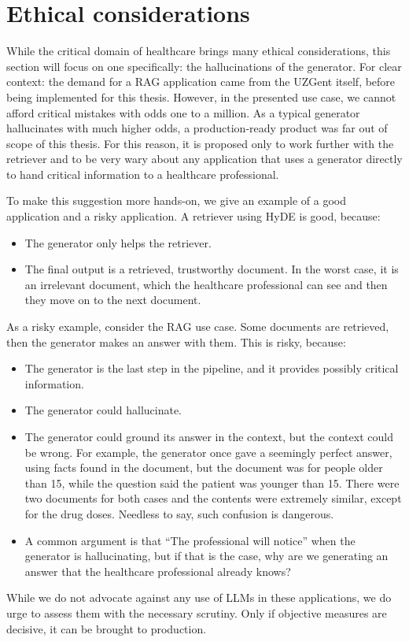 \section{Ethical considerations}
\label{Ethical considerations}
While the critical domain of healthcare brings many ethical considerations, this section will focus on one specifically: the hallucinations of the generator. For clear context: the demand for a RAG application came from the UZGent itself, before being implemented for this thesis. However, in the presented use case, we cannot afford critical mistakes with odds one to a million. As a typical generator hallucinates with much higher odds, a production-ready product was far out of scope of this thesis. For this reason, it is proposed only to work further with the retriever and to be very wary about any application that uses a generator directly to hand critical information to a healthcare professional. 

To make this suggestion more hands-on, we give an example of a good application and a risky application. A retriever using HyDE is good, because:
\begin{itemize}
    \item The generator only helps the retriever.
    \item The final output is a retrieved, trustworthy document. In the worst case, it is an irrelevant document, which the healthcare professional can see and then they move on to the next document.
\end{itemize}
As a risky example, consider the RAG use case. Some documents are retrieved, then the generator makes an answer with them. This is risky, because:
\begin{itemize}
    \item The generator is the last step in the pipeline, and it provides possibly critical information.
    \item The generator could hallucinate.
    \item The generator could ground its answer in the context, but the context could be wrong. For example, the generator once gave a seemingly perfect answer, using facts found in the document, but the document was for people older than 15, while the question said the patient was younger than 15. There were two documents for both cases and the contents were extremely similar, except for the drug doses. Needless to say, such confusion is dangerous.
    \item A common argument is that ``The professional will notice'' when the generator is hallucinating, but if that is the case, why are we generating an answer that the healthcare professional already knows?
\end{itemize}

While we do not advocate against any use of LLMs in these applications, we do urge to assess them with the necessary scrutiny. Only if objective measures are decisive, it can be brought to production.

